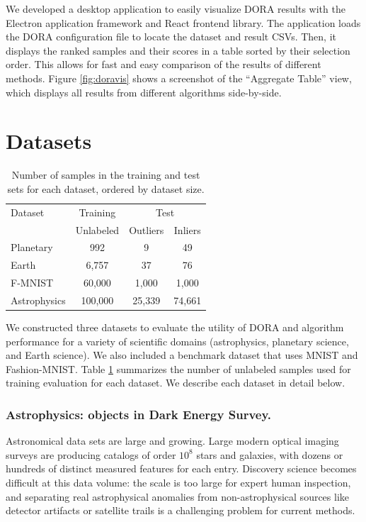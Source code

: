 \documentclass[letterpaper]{article} %
\begin{document}
We developed a desktop application to easily visualize DORA results with the
Electron application framework and React frontend library. The application loads
the DORA configuration file to locate the dataset and result CSVs. Then,
it displays the ranked samples and their scores in a table sorted by their
selection order. This allows for fast and easy comparison of the results of
different methods. Figure \ref{fig:doravis} shows a screenshot of the
``Aggregate Table'' view, which displays all results from different algorithms
side-by-side.

\section{Datasets}
\begin{table}
  \caption{Number of samples in the training and test sets for each dataset,
  ordered by dataset size.}
  \label{tab:datasets}
  \centering
  \begin{tabular}{l|c|cc}
    \hline
    Dataset & Training & \multicolumn{2}{c}{Test}\\
     & Unlabeled &  Outliers &  Inliers \\
    
    \hline
    Planetary & 992 &  9 & 49 \\
    Earth & 6,757 & 37 & 76  \\
    F-MNIST & 60,000 & 1,000 & 1,000  \\
    Astrophysics & 100,000   &  25,339 &  74,661 \\
    \hline
  \end{tabular}
\end{table}

We constructed three datasets to evaluate the utility of DORA and 
algorithm performance for a variety of scientific domains
 (astrophysics, planetary science, and Earth science). We also included a 
 benchmark dataset that uses MNIST and Fashion-MNIST. Table \ref{tab:datasets}
 summarizes the number of unlabeled samples used for training evaluation for
 each dataset. We describe each dataset in detail below.

\subsubsection{Astrophysics: objects in Dark Energy Survey.}
Astronomical data sets are large and growing. Large modern optical
imaging surveys are producing catalogs of order $10^8$ stars
and galaxies, with dozens or hundreds of distinct measured features
for each entry. Discovery science becomes difficult at this data
volume: the scale is too large for expert human inspection, and separating real
astrophysical anomalies from non-astrophysical sources like detector artifacts or
satellite trails is a challenging problem for current methods.
\end{document}
